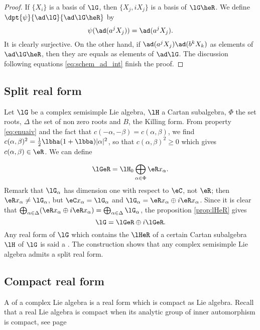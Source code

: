 \begin{proof}
If $\{X_i\}$ is a basis of $\lG$, then $\{X_j,iX_j\}$ is a basis of $\lG\heR$. We define $\dpt{\psi}{\ad\lG}{\ad\lG\heR}$ by
\[
   \psi(\ad(a^jX_j))=\ad(a^jX_j).
\]
It is clearly surjective. On the other hand, if $\ad(a^jX_j)\ad(b^kX_k)$ as elements of $\ad\lG\heR$, then they are equals as elements of $\ad\lG$. The discussion following equations \eqref{eq:schem_ad_int} finish the proof.
\end{proof}

\subsection{Split real form}

Let $\lG$ be a complex semisimple Lie algebra, $\lH$ a Cartan subalgebra, $\Phi$ the set roots, $\Delta$ the set of non zero roots and $B$, the Killing form. From property \eqref{eq:enuaiv} and the fact that $c(-\alpha,-\beta)=c(\alpha,\beta)$, we find $c(\alpha,\beta)^2=\frac{1}{2}\lbha(1+\lbba)|\alpha|^2$,
 so that $c(\alpha,\beta)^2\geq 0$ which gives $c(\alpha,\beta)\in\eR$. We can define
 
\[
   \lGeR=\lH_0\bigoplus_{\alpha\in\Phi}\eR x_{\alpha}.
\]
Remark that $\lG_{\alpha}$ has dimension one with respect to $\eC$, not $\eR$; then $\eR x_{\alpha}\neq\lG_{\alpha}$, but $\eC x_{\alpha}=\lG_{\alpha}$ and $\lG_{\alpha}=\eR x_{\alpha}\oplus i\eR x_{\alpha}$. Since it is clear that $\bigoplus_{\alpha\in\Delta}( \eR x_{\alpha}\oplus i\eR x_{\alpha} )=\bigoplus_{\alpha\in\Delta}\lG_{\alpha}$, the proposition \ref{prop:lHeR} gives
\begin{equation}
  \lG=\lGeR\oplus i\lGeR.
\end{equation}
Any real form of $\lG$ which contains the $\lHeR$ of a certain Cartan subalgebra $\lH$ of $\lG$ is said a . The construction shows that any complex semisimple Lie algebra admits a split real form.

\subsection{Compact real form}

A  of a complex Lie algebra is a real form which is compact as Lie algebra. Recall that a real Lie algebra is compact when its analytic group of inner automorphism is compact, see page \pageref{pg:compact_Lie}

